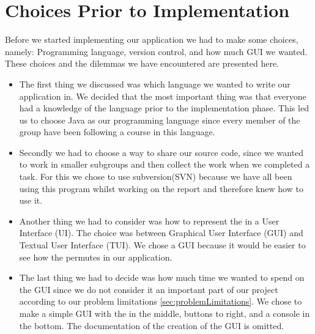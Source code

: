 \chapter{Choices Prior to Implementation}
Before we started implementing our application we had to make some choices, namely: Programming language, version control, and how much GUI we wanted.
These choices and the dilemmas we have encountered are presented here.

\begin{itemize}
	\item The first thing we discussed was which language we wanted to write our application in.
We decided that the most important thing was that everyone had a knowledge of the language prior to the implementation phase.
This led us to choose Java as our programming language since every member of the group have been following a course in this language.

	\item Secondly we had to choose a way to share our source code, since we wanted to work in smaller subgroups and then collect the work when we completed a task.
For this we chose to use subversion(SVN) because we have all been using this program whilst working on the report and therefore knew how to use it.

	\item Another thing we had to consider was how to represent the \rubik{} in a User Interface (UI). The choice was between Graphical User Interface (GUI) and Textual User Interface (TUI). We chose a GUI because it would be easier to see how the \rubik{} permutes in our application.  
	\item The last thing we had to decide was how much time we wanted to spend on the GUI since we do not consider it an important part of our project according to our problem limitations \ref{sec:problemLimitations}.
We chose to make a simple GUI with the \rubik{} in the middle, buttons to right, and a console in the bottom.
The documentation of the creation of the GUI is omitted.
\end{itemize}
